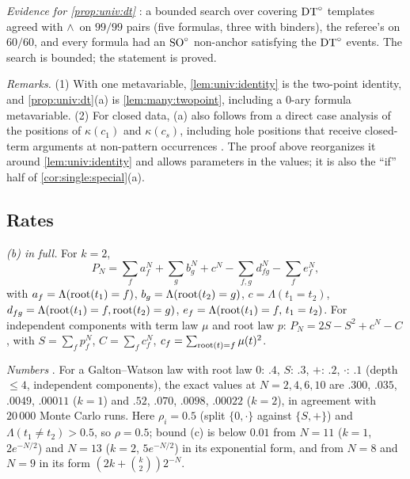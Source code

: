 \emph{Evidence for \cref{prop:univ:dt}} : a bounded search over covering $\mathrm{DT}^{\circ}$ templates agreed with \evR$\wedge$\evD\ on $99/99$ pairs (five formulas, three with binders), the referee's on $60/60$, and every formula had an $\mathrm{SO}^{\circ}$ non-anchor satisfying the $\mathrm{DT}^{\circ}$ events. The search is bounded; the statement is proved.

\emph{Remarks.} (1) With one metavariable, \cref{lem:univ:identity} is the two-point identity, and \cref{prop:univ:dt}(a) is \cref{lem:many:twopoint}, including a $0$-ary formula metavariable. (2) For closed data, (a) also follows from a direct case analysis of the positions of $\kappa(c_1)$ and $\kappa(c_s)$, including hole positions that receive closed-term arguments at non-pattern occurrences . The proof above reorganizes it around \cref{lem:univ:identity} and allows parameters in the values; it is also the ``if'' half of \cref{cor:single:special}(a).

\subsection{Rates}\label{app:univ:rates}

\emph{(b) in full.} For $k=2$,
\[P_N=\textstyle\sum_fa_f^N+\sum_gb_g^N+c^N-\sum_{f,g}d_{fg}^N-\sum_fe_f^N,\]
with $a_f=\Lambda(\mathrm{root}(t_1)=f)$, $b_g=\Lambda(\mathrm{root}(t_2)=g)$, $c=\Lambda(t_1=t_2)$, $d_{fg}=\Lambda(\mathrm{root}(t_1)=f,\mathrm{root}(t_2)=g)$, $e_f=\Lambda(\mathrm{root}(t_1)=f,\,t_1=t_2)$. For independent components with term law $\mu$ and root law $p$: $P_N=2S-S^2+c^N-C$, with $S=\sum_fp_f^N$, $C=\sum_fc_f^N$, $c_f=\sum_{\mathrm{root}(t)=f}\mu(t)^2$.

\emph{Numbers} . For a Galton--Watson law with root law $0{:}\,.4$, $S{:}\,.3$, $+{:}\,.2$, $\cdot{:}\,.1$ (depth $\le4$, independent components), the exact values at $N=2,4,6,10$ are $.300$, $.035$, $.0049$, $.00011$ ($k=1$) and $.52$, $.070$, $.0098$, $.00022$ ($k=2$), in agreement with $20\,000$ Monte Carlo runs. Here $\rho_i=0.5$ (split $\{0,\cdot\}$ against $\{S,+\}$) and $\Lambda(t_1\neq t_2)>0.5$, so $\rho=0.5$; bound (c) is below $0.01$ from $N=11$ ($k=1$, $2e^{-N/2}$) and $N=13$ ($k=2$, $5e^{-N/2}$) in its exponential form, and from $N=8$ and $N=9$ in its form $(2k+\binom k2)2^{-N}$.

